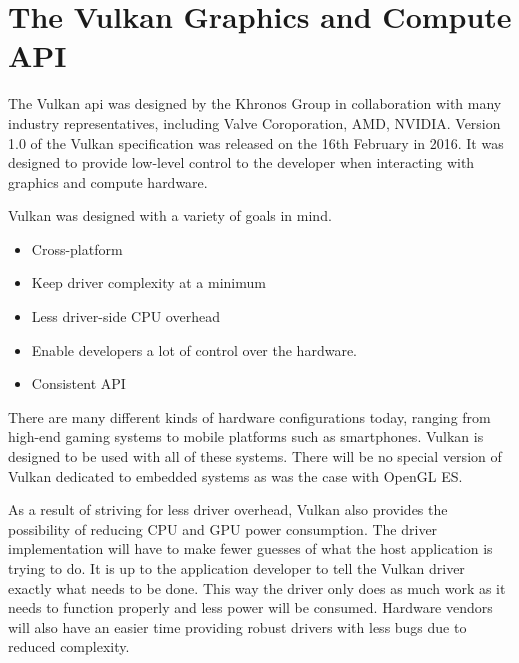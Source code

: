 

  \section{The Vulkan Graphics and Compute API}

    The Vulkan \gls{api} was designed by the Khronos Group in collaboration with many industry representatives, including Valve Coroporation, AMD, NVIDIA. Version 1.0 of the Vulkan specification was released on the 16th February in 2016. It was designed to provide low-level control to the developer when interacting with graphics and compute hardware.

    Vulkan was designed with a variety of goals in mind.

    \begin{itemize}
      \item Cross-platform
      \item Keep driver complexity at a minimum
      \item Less driver-side CPU overhead
      \item Enable developers a lot of control over the hardware.
      \item Consistent API
    \end{itemize}

    There are many different kinds of hardware configurations today, ranging from high-end gaming systems to mobile platforms such as smartphones. Vulkan is designed to be used with all of these systems. There will be no special version of Vulkan dedicated to embedded systems as was the case with OpenGL ES.

    As a result of striving for less driver overhead, Vulkan also provides the possibility of reducing CPU and GPU power consumption. The driver implementation will have to make fewer guesses of what the host application is trying to do. It is up to the application developer to tell the Vulkan driver exactly what needs to be done. This way the driver only does as much work as it needs to function properly and less power will be consumed. Hardware vendors will also have an easier time providing robust drivers with less bugs due to reduced complexity.

